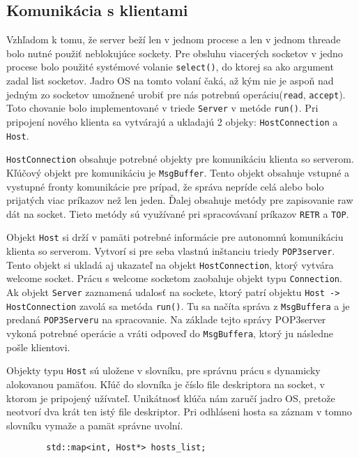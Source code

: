 \documentclass[a4paper, 11pt]{article}
\begin{document}
	\subsection{Komunikácia s klientami}
	Vzhľadom k tomu, že server beží len v jednom procese a len v jednom threade bolo nutné použiť neblokujúce sockety. Pre obsluhu viacerých socketov v jedno procese bolo použité systémové volanie {\tt select()}, do ktorej sa ako argument zadal list socketov. Jadro OS na tomto volaní čaká, až kým nie je aspoň nad jedným zo socketov umožnené urobiť pre nás potrebnú operáciu({\tt read}, {\tt accept}). Toto  chovanie bolo implementované v triede {\tt Server} v metóde {\tt run()}. Pri pripojení nového klienta sa vytvárajú a ukladajú 2 objeky: {\tt HostConnection} a {\tt Host}. 
	
	{\tt HostConnection} obsahuje potrebné objekty pre komunikáciu klienta so serverom. Kľúčový objekt pre komunikáciu je {\tt MsgBuffer}. Tento objekt obsahuje vstupné a vystupné fronty komunikácie pre prípad, že správa nepríde celá alebo bolo prijatých viac príkazov než len jeden. Ďalej obsahuje metódy pre zapisovanie raw dát na socket. Tieto metódy sú využívané pri spracovávaní príkazov {\tt RETR} a {\tt TOP}.

	Objekt {\tt Host} si drží v pamäti potrebné informácie pre autonomnú komunikáciu klienta so serverom. Vytvorí si pre seba vlastnú inštanciu triedy {\tt POP3server}. Tento objekt si ukladá aj ukazateľ na objekt {\tt HostConnection}, ktorý vytvára welcome socket. Prácu s welcome socketom zaobaluje objekt typu {\tt Connection}. Ak objekt {\tt Server} zaznamená udalosť na sockete, ktorý patrí objektu {\tt Host -> HostConnection} zavolá sa metóda {\tt run()}. Tu sa načíta správa z {\tt MsgBuffera} a je predaná {\tt POP3Serveru} na spracovanie. Na základe tejto správy POP3server vykoná potrebné operácie a vráti odpoveď do {\tt MsgBuffera}, ktorý ju následne pošle klientovi. 
	
	Objekty typu {\tt Host} sú uložene v slovníku, pre správnu prácu s dynamicky alokovanou pamäťou. Kľúč do slovníka je číslo file deskriptora na socket, v ktorom je pripojený užívateľ. Unikátnosť klúča nám zaručí jadro OS, pretože neotvorí dva krát ten istý file deskriptor. Pri odhláseni hosta sa záznam v tomno slovníku vymaže a pamät správne uvolní. 
	\begin{lstlisting}
		std::map<int, Host*> hosts_list;
	\end{lstlisting}
	
	
\end{document}
